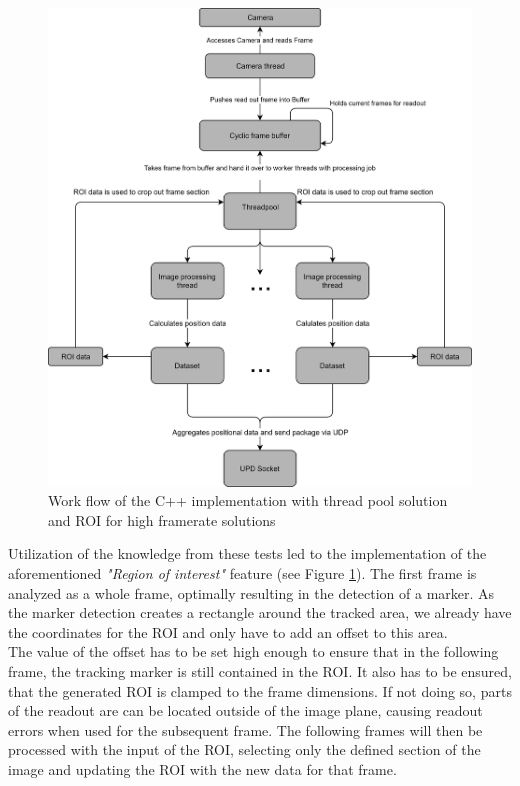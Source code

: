 \begin{figure}[H]
\includegraphics[width=\textwidth]{images/pi_workflow_500.jpg}
\caption{Work flow of the C++ implementation with thread pool solution and ROI for high framerate solutions}
\label{c++ work flow map} 
\end{figure}
Utilization of the knowledge from these tests led to the implementation of the aforementioned\textit{ "Region of interest"} feature (see Figure \ref{c++ work flow map}).
The first frame is analyzed as a whole frame, optimally resulting in the detection of a marker. As the marker detection creates a rectangle around the tracked area, we already have the coordinates for the ROI and only have to add an offset to this area.
\\The value of the offset has to be set high enough to ensure that in the following frame, the tracking marker is still contained in the ROI. It also has to be ensured, that the generated ROI is clamped to the frame dimensions. If not doing so, parts of the readout are can be located outside of the image plane, causing readout errors when used for the subsequent frame. The following frames will then be processed with the input of the ROI, selecting only the defined section of the image and updating the ROI with the new data for that frame.\\
